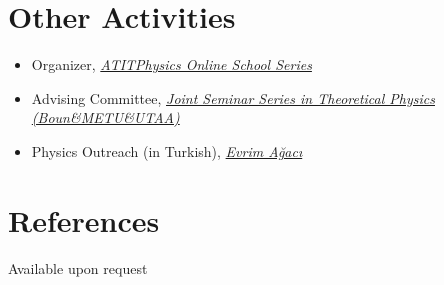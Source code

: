 \documentclass[a4paper,11pt]{article}
\begin{document}
\section{\textcolor{burntorange}{Other Activities}}
\begin{itemize}
	\item[] Organizer, \emph{\hyperref{https://www.atitphysics.com}{}{}{ATITPhysics Online School Series}}
	\item[] Advising Committee, \emph{\hyperref{https://sites.google.com/view/boun-metu-utaajointseminerseri/}{}{}{Joint Seminar Series in Theoretical Physics (Boun\&METU\&UTAA)}}
	\item[] Physics Outreach (in Turkish), \emph{\hyperref{https://youtube.com/playlist?list=PL48IwtBKtXrZcWuuJFpcflBkSqJv6YrW9}{}{}{Evrim Ağacı}}
\end{itemize}

\section{\textcolor{burntorange}{References}}
\hspace*{2em}Available upon request

\end{document}

